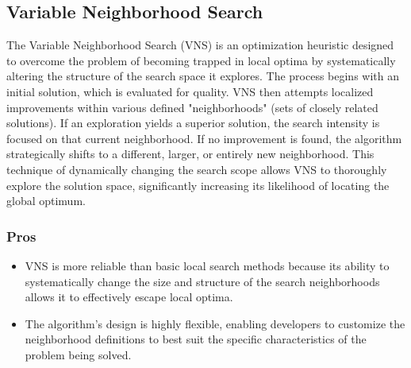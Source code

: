 \documentclass[conference]{IEEEtran}
\begin{document}
\subsection{Variable Neighborhood Search}
The Variable Neighborhood Search (VNS) is an optimization heuristic designed to overcome the problem of becoming trapped in local optima by systematically altering the structure of the search space it explores. The process begins with an initial solution, which is evaluated for quality. VNS then attempts localized improvements within various defined "neighborhoods" (sets of closely related solutions). If an exploration yields a superior solution, the search intensity is focused on that current neighborhood. If no improvement is found, the algorithm strategically shifts to a different, larger, or entirely new neighborhood. This technique of dynamically changing the search scope allows VNS to thoroughly explore the solution space, significantly increasing its likelihood of locating the global optimum.


\subsubsection{Pros}
\begin{itemize}
    \item VNS is more reliable than basic local search methods because its ability to systematically change the size and structure of the search neighborhoods allows it to effectively escape local optima.
    \item The algorithm's design is highly flexible, enabling developers to customize the neighborhood definitions to best suit the specific characteristics of the problem being solved.
\end{itemize}
\end{document}
